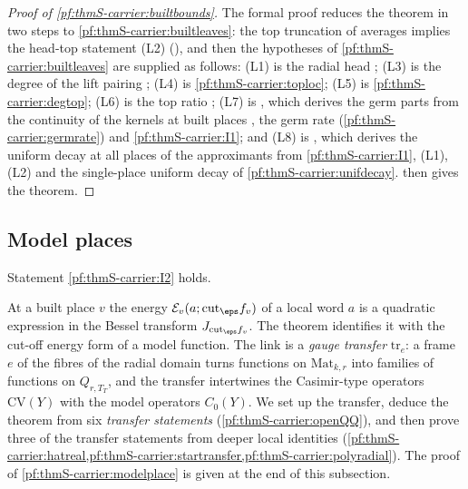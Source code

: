 \begin{proof}[Proof of \cref{pf:thmS-carrier:builtbounds}]
The formal proof reduces the theorem in two steps to \cref{pf:thmS-carrier:builtleaves}: the top truncation of averages
 implies the head-top statement (L2)
(), and then the hypotheses of \cref{pf:thmS-carrier:builtleaves}
are supplied as follows: (L1) is the radial head ; (L3) is the degree of the
lift pairing ; (L4) is \cref{pf:thmS-carrier:toploc}; (L5) is
\cref{pf:thmS-carrier:degtop}; (L6) is the top ratio ; (L7) is
, which derives the germ parts from the continuity of the
kernels at built places , the germ rate
(\cref{pf:thmS-carrier:germrate}) and \ref{pf:thmS-carrier:I1}; and (L8) is
, which derives the uniform decay at all places of the
approximants from \ref{pf:thmS-carrier:I1}, (L1), (L2) and the single-place uniform decay of \cref{pf:thmS-carrier:unifdecay}.
 then gives the theorem.
\end{proof}

\subsection{Model places}\label{sec:pf:thmS-carrier:model}

\begin{theorem}\label{pf:thmS-carrier:modelplace}
Statement \ref{pf:thmS-carrier:I2} holds.
\end{theorem}

At a built place $v$ the energy $\mathcal E_v(a;\mathrm{cut}_\eps f_v)$ of a local word $a$ is a quadratic expression in the
Bessel transform $J_{\mathrm{cut}_\eps f_v}$. The theorem identifies it with the cut-off energy form of a model function.
The link is a \emph{gauge transfer} $\mathrm{tr}_e$: a frame $e$ of the fibres of the radial domain turns functions on
$\mathrm{Mat}_{k,r}$ into families of functions on $Q_{r,T_T}$, and the transfer intertwines the Casimir-type operators
$\mathrm{CV}(Y)$ with the model operators $C_0(Y)$. We set up the transfer, deduce the theorem from six \emph{transfer
statements} (\cref{pf:thmS-carrier:openQQ}), and then prove three of the transfer statements from deeper local identities
(\cref{pf:thmS-carrier:hatreal,pf:thmS-carrier:startransfer,pf:thmS-carrier:polyradial}). The proof of
\cref{pf:thmS-carrier:modelplace} is given at the end of this subsection.

